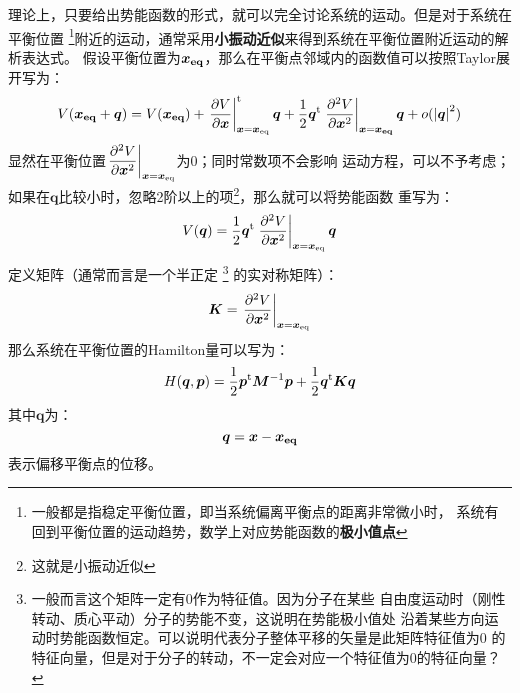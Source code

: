     理论上，只要给出势能函数的形式，就可以完全讨论系统的运动。但是对于系统在平衡位置
    \footnote{一般都是指稳定平衡位置，即当系统偏离平衡点的距离非常微小时，
    系统有回到平衡位置的运动趋势，数学上对应势能函数的\textbf{极小值点}
    }附近的运动，通常采用\textbf{小振动近似}来得到系统在平衡位置附近运动的解析表达式。
    假设平衡位置为$\bm{x_{\mathrm{eq}}}$，那么在平衡点邻域内的函数值可以按照Taylor展开写为：
    \begin{equation}
        \begin{split}
        V(\bm{x_{\mathrm{eq}}} + \bm{q}) &= V(\bm{x_{\mathrm{eq}}}) + \left.\frac{\partial{V}}{\partial{\bm{x}}}\right|_{\bm{x} = \bm{x}_{\mathrm{eq}}}^{\mathrm{t}}\bm{q}
         + \frac{1}{2}\bm{q}^{\mathrm{t}}\left.\frac{\partial{^2V}}{\partial{\bm{x}^2}}\right|_{\bm{x} = \bm{x_{\mathrm{eq}}}}\bm{q} + o(\left|\bm{q}\right|^2)\\
        \end{split}
    \end{equation}
    显然在平衡位置$\displaystyle\left.\frac{\partial{^2V}}{\partial{\bm{x}^2}}\right|_{\bm{x} = \bm{x}_{\mathrm{eq}}}$为0；同时常数项不会影响
    运动方程，可以不予考虑；如果在$\bm{q}$比较小时，忽略2阶以上的项\footnote{这就是小振动近似}，那么就可以将势能函数
    重写为：
    \begin{equation}
        V(\bm{q}) = \frac{1}{2}\bm{q}^{\mathrm{t}}\left.\frac{\partial{^2V}}{\partial{\bm{x}^2}}\right|_{\bm{x} = \bm{x}_{\mathrm{eq}}}\bm{q}
        \label{potential at equilibrium point}
    \end{equation}
    定义矩阵（通常而言是一个半正定
    \footnote{
        一般而言这个矩阵一定有0作为特征值。因为分子在某些
        自由度运动时（刚性转动、质心平动）分子的势能不变，这说明在势能极小值处
        沿着某些方向运动时势能函数恒定。可以说明代表分子整体平移的矢量是此矩阵特征值为0
        的特征向量，但是对于分子的转动，不一定会对应一个特征值为0的特征向量？
    }
    的实对称矩阵）：
    \begin{equation}
        \bm{K} = \left.\frac{\partial{^2V}}{\partial{\bm{x}^2}}\right|_{\bm{x} = \bm{x}_{\mathrm{eq}}}
        \label{potential matrix}
    \end{equation}
    那么系统在平衡位置的Hamilton量可以写为：
    \begin{equation}
        H(\bm{q}, \bm{p}) = \frac{1}{2}\bm{p}^{\mathrm{t}}\bm{M}^{-1}\bm{p} + \frac{1}{2}\bm{q}^{\mathrm{t}}\bm{K}\bm{q}
        \label{the Hamiltonian of samll vibration}
    \end{equation}
    其中$\bm{q}$为：
    \begin{equation}
        \bm{q} = \bm{x} - \bm{x_{\mathrm{eq}}}
    \end{equation}
    表示偏移平衡点的位移。

